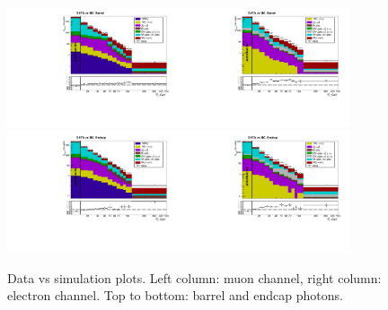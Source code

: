 \begin{figure}[htb]
  \begin{center}
   \includegraphics[width=0.45\textwidth]{../figs/figs_v11/MUON_WGamma/PrepareYields/c_TotalDATAvsMC_Barrel__phoEt.pdf}\includegraphics[width=0.45\textwidth]{../figs/figs_v11/ELECTRON_WGamma/PrepareYields/c_TotalDATAvsMC_Barrel__phoEt.pdf}
   \includegraphics[width=0.45\textwidth]{../figs/figs_v11/MUON_WGamma/PrepareYields/c_TotalDATAvsMC_Endcap__phoEt.pdf}\includegraphics[width=0.45\textwidth]{../figs/figs_v11/ELECTRON_WGamma/PrepareYields/c_TotalDATAvsMC_Endcap__phoEt.pdf}
  \caption{Data vs simulation plots. Left column: muon channel, right column: electron channel. Top to bottom: barrel and endcap photons.}
  \label{fig:DATAvsMC}
  \end{center}
\end{figure}



